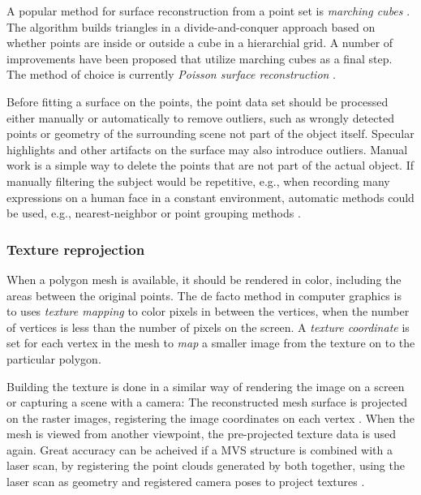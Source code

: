 A popular method for surface reconstruction from a point set is \emph{marching cubes} \cite{lorensen1987marching}.
The algorithm builds triangles in a divide-and-conquer approach based on whether points are inside or outside a cube in a hierarchial grid.
A number of improvements have been proposed that utilize marching cubes as a final step.
The method of choice is currently \emph{Poisson surface reconstruction} \cite{kazhdan2006poisson,kazhdan2013screened}.

Before fitting a surface on the points, the point data set should be processed either manually or automatically to remove outliers, such as wrongly detected points or geometry of the surrounding scene not part of the object itself.
Specular highlights and other artifacts on the surface may also introduce outliers.
Manual work is a simple way to delete the points that are not part of the actual object.
If manually filtering the subject would be repetitive, e.g., when recording many expressions on a human face in a constant environment, automatic methods could be used, e.g., nearest-neighbor or point grouping methods \cite{pcl}.



\subsubsection{Texture reprojection} %

When a polygon mesh is available, it should be rendered in color, including the areas between the original points.
The de facto method in computer graphics is to uses \emph{texture mapping} to color pixels in between the vertices, when the number of vertices is less than the number of pixels on the screen.
A \emph{texture coordinate} is set for each vertex in the mesh to \emph{map} a smaller image from the texture on to the particular polygon. \cite{heckbert1986survey}

Building the texture is done in a similar way of rendering the image on a screen or capturing a scene with a camera:
The reconstructed mesh surface is projected on the raster images, registering the image coordinates on each vertex \cite[p. 610]{szeliski10vision} \cite[p. 98]{heyden2005multiple}.
When the mesh is viewed from another viewpoint, the pre-projected texture data is used again.
Great accuracy can be acheived if a MVS structure is combined with a laser scan, by registering the point clouds generated by both together, using the laser scan as geometry and registered camera poses to project textures \cite{liu2006multiview}.

